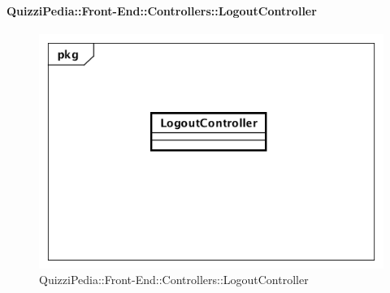 \paragraph{QuizziPedia::Front-End::Controllers::LogoutController}
\begin{figure} [ht]
	\centering
	\includegraphics[scale=0.45]{UML/Classi/Front-End/QuizziPedia_Front-end_Controller_LogoutController.png}
	\caption{QuizziPedia::Front-End::Controllers::LogoutController}
\end{figure} \FloatBarrier
